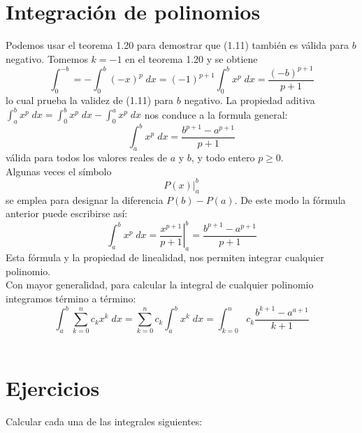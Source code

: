 \section{Integración de polinomios}
Podemos usar el teorema 1.20 para demostrar que (1.11) también es válida para $b$ negativo. Tomemos $k=-1$ en el teorema 1.20 y se obtiene $$\int_0^{-b} = - \int_0^b (-x)^p \; dx = (-1)^{p+1} \int_0^b x^p \; dx = \dfrac{(-b)^{p+1}}{p+1}$$ lo cual prueba la validez de (1.11) para $b$ negativo. La propiedad aditiva $\int_a^b x^p \; dx = \int_0^b x^p \; dx - \int_0^a x^p \;dx$ nos conduce a la formula general: $$\int_a^b x^p \; dx = \dfrac{b^{p+1}-a^{p+1}}{p+1}$$
válida para todos los valores reales de $a$ y $b$, y todo entero $p\geq 0$.\\
Algunas veces el símbolo $$P(x)\left.\right|_a^b$$
se emplea para designar la diferencia $P(b)-P(a)$. De este modo la fórmula anterior puede escribirse así: $$\int_a^b x^p \; dx = \left.\dfrac{x^{p+1}}{p+1}\right|_a^b = \dfrac{b^{p+1}-a^{p+1}}{p+1}$$
Esta fórmula y la propiedad de linealidad, nos permiten integrar cualquier polinomio.\\
Con mayor generalidad, para calcular la integral de cualquier polinomio integramos término a término: $$\int_a^b \sum_{k=0}^n c_k x^k \; dx = \sum_{k=0}^n c_k \int_a^b x^k  \; dx = \int_{k=0}^n c_k \dfrac{b^{k+1} - a^{a+1}}{k+1}$$\\


\section{Ejercicios}
Calcular cada una de las integrales siguientes:\\\\

